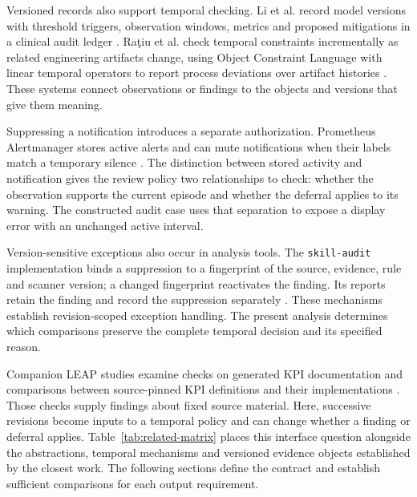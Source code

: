 \documentclass[preprint,11pt]{elsarticle}
\newcommand{\code}[1]{\texttt{#1}}
\begin{document}
Versioned records also support temporal checking. Li et al. record model versions with threshold triggers, observation windows, metrics and proposed mitigations in a clinical audit ledger \cite{li2026sentinel}. Ra\c{t}iu et al. check temporal constraints incrementally as related engineering artifacts change, using Object Constraint Language with linear temporal operators to report process deviations over artifact histories \cite{ratiu2026runtime}. These systems connect observations or findings to the objects and versions that give them meaning.

Suppressing a notification introduces a separate authorization. Prometheus Alertmanager stores active alerts and can mute notifications when their labels match a temporary silence \cite{prometheus2026alertmanager}. The distinction between stored activity and notification gives the review policy two relationships to check: whether the observation supports the current episode and whether the deferral applies to its warning. The constructed audit case uses that separation to expose a display error with an unchanged active interval.

Version-sensitive exceptions also occur in analysis tools. The \code{skill-audit} implementation binds a suppression to a fingerprint of the source, evidence, rule and scanner version; a changed fingerprint reactivates the finding. Its reports retain the finding and record the suppression separately \cite{skillaudit2026suppression}. These mechanisms establish revision-scoped exception handling. The present analysis determines which comparisons preserve the complete temporal decision and its specified reason.

Companion LEAP studies examine checks on generated KPI documentation and comparisons between source-pinned KPI definitions and their implementations \cite{mouawadjones2026checks,mouawad2026discrepancies}. Those checks supply findings about fixed source material. Here, successive revisions become inputs to a temporal policy and can change whether a finding or deferral applies. Table~\ref{tab:related-matrix} places this interface question alongside the abstractions, temporal mechanisms and versioned evidence objects established by the closest work. The following sections define the contract and establish sufficient comparisons for each output requirement.
\end{document}
